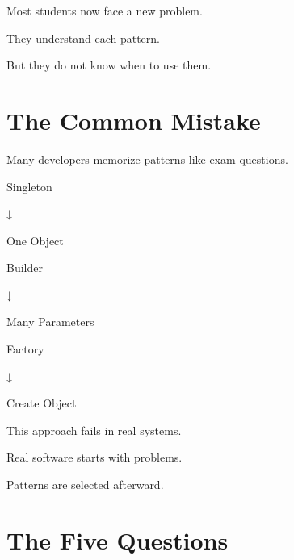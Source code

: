 \documentclass[11pt,a4paper]{book}
\begin{document}

Most students now face a new problem.


They understand each pattern.


But they do not know when to use them.


\section{The Common Mistake}

\begin{trap}

Many developers memorize patterns
like exam questions.


Singleton

↓

One Object


Builder

↓

Many Parameters


Factory

↓

Create Object


This approach fails in real systems.


Real software starts with problems.


Patterns are selected afterward.

\end{trap}

\section{The Five Questions}
\end{document}
